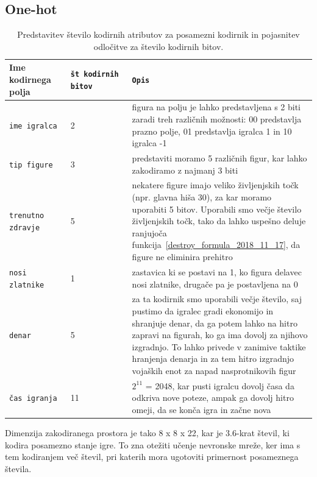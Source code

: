 \documentclass[a4paper, 12pt]{book}
\begin{document}
\subsection{One-hot}
\label{oneHotEncoder}
\begin{table}
	\begin{center}
		\begin{tabular}{p{0.2\linewidth}|p{0.2\linewidth}|p{0.6\linewidth}}
			Ime kodirnega polja      & {\tt št kodirnih bitov} & {\tt Opis} \\ \hline
			{\tt ime igralca}        & 2                       & figura na polju je lahko predstavljena s 2 biti zaradi treh različnih možnosti: 00 predstavlja prazno polje, 01 predstavlja igralca 1 in 10 igralca -1 \\
			{\tt tip figure}         & 3                       & predstaviti moramo 5 različnih figur, kar lahko zakodiramo z najmanj 3 biti\\
			{\tt trenutno zdravje}   & 5                       & nekatere figure imajo veliko življenjskih točk (npr. glavna hiša 30), za kar moramo uporabiti 5 bitov. 
																 Uporabili smo večje število življenjskih točk, tako da lahko uspešno deluje ranjujoča funkcija~\ref{destroy_formula_2018_11_17}, da figure ne eliminira prehitro \\
			{\tt nosi zlatnike}      & 1                       & zastavica ki se postavi na 1, ko figura delavec nosi zlatnike, drugače pa je postavljena na 0 \\
			{\tt denar}              & 5                       & za ta kodirnik smo uporabili večje število, saj pustimo da igralec gradi ekonomijo in shranjuje denar, da ga potem lahko na hitro zapravi na figurah, ko ga ima dovolj za njihovo izgradnjo.
																 To lahko privede v zanimive taktike hranjenja denarja in za tem hitro izgradnjo vojaških enot za napad nasprotnikovih figur \\
			{\tt čas igranja}        & 11                      & $2^{11}$ = 2048, kar pusti igralcu dovolj časa da odkriva nove poteze, ampak ga dovolj hitro omeji, da se konča igra in začne nova \\
		\end{tabular}
	\end{center}
	\caption{Predstavitev število kodirnih atributov za posamezni kodirnik in pojasnitev odločitve za število kodirnih bitov. }
	\label{tableEncodersOneHot}
\end{table}

Dimenzija zakodiranega prostora je tako 8 x 8 x 22, kar je 3.6-krat števil, ki kodira posamezno stanje igre.
To zna otežiti učenje nevronske mreže, ker ima s tem kodiranjem več števil, pri katerih mora ugotoviti primernost posameznega števila.
\end{document}
